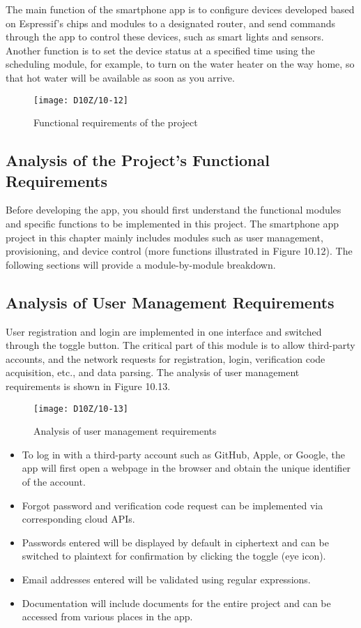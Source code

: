 \documentclass[a4paper,12pt]{book}
\begin{document}
The main function of the smartphone app is to configure devices developed based on Espressif’s chips and modules to a designated router, and send commands through the app to control these devices, such as smart lights and sensors. Another function is to set the device status at a specified time using the scheduling module, for example, to turn on the water heater on the way home, so that hot water will be available as soon as you arrive.

\begin{figure}[ht]
    \centering
    \texttt{[image: D10Z/10-12]}
    \caption{Functional requirements of the project}
\end{figure}

\subsection{Analysis of the Project’s Functional Requirements}
Before developing the app, you should first understand the functional modules and specific functions to be implemented in this project. The smartphone app project in this chapter mainly includes modules such as user management, provisioning, and device control (more functions illustrated in Figure 10.12). The following sections will provide a module-by-module breakdown.

\subsection{Analysis of User Management Requirements}
User registration and login are implemented in one interface and switched through the toggle button. The critical part of this module is to allow third-party accounts, and the network requests for registration, login, verification code acquisition, etc., and data parsing. The analysis of user management requirements is shown in Figure 10.13.

\begin{figure}[ht]
    \centering
    \texttt{[image: D10Z/10-13]}
    \caption{Analysis of user management requirements}
\end{figure}

\begin{itemize}
    \item To log in with a third-party account such as GitHub, Apple, or Google, the app will first open a webpage in the browser and obtain the unique identifier of the account.
    \item Forgot password and verification code request can be implemented via corresponding cloud APIs.
    \item Passwords entered will be displayed by default in ciphertext and can be switched to plaintext for confirmation by clicking the toggle (eye icon).
    \item Email addresses entered will be validated using regular expressions.
    \item Documentation will include documents for the entire project and can be accessed from various places in the app.
\end{itemize}
\end{document}

